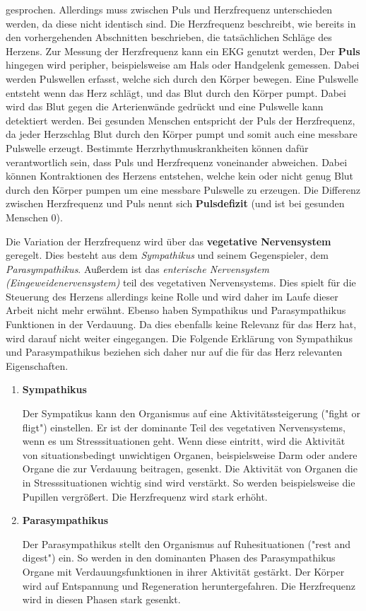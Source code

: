 gesprochen. Allerdings muss zwischen Puls und Herzfrequenz unterschieden werden, da diese nicht identisch sind. 
Die Herzfrequenz beschreibt, wie bereits in den vorhergehenden Abschnitten beschrieben, die tatsächlichen Schläge des Herzens. Zur Messung der Herzfrequenz kann ein EKG genutzt werden,
Der \textbf{Puls} hingegen wird peripher, beispielsweise am Hals oder Handgelenk gemessen. Dabei werden Pulswellen erfasst, welche sich durch den Körper bewegen. Eine Pulswelle entsteht wenn das Herz schlägt, und das Blut durch den Körper pumpt. Dabei wird das Blut gegen die Arterienwände gedrückt und eine Pulswelle kann detektiert werden.
Bei gesunden Menschen entspricht der Puls der Herzfrequenz, da jeder Herzschlag Blut durch den Körper pumpt und somit auch eine messbare Pulswelle erzeugt. Bestimmte Herzrhythmuskrankheiten können dafür verantwortlich sein, dass Puls und Herzfrequenz voneinander abweichen. Dabei können Kontraktionen des Herzens entstehen, welche kein oder nicht genug Blut durch den Körper pumpen um eine messbare Pulswelle zu erzeugen. Die Differenz zwischen Herzfrequenz und Puls nennt sich \textbf{Pulsdefizit} (und ist bei gesunden Menschen 0).

Die Variation der Herzfrequenz wird über das \textbf{vegetative Nervensystem} geregelt. Dies besteht aus dem \textit{Sympathikus} und seinem Gegenspieler, dem \textit{Parasympathikus}. Außerdem ist das \textit{enterische Nervensystem (Eingeweidenervensystem)} teil des vegetativen Nervensystems. Dies spielt für die Steuerung des Herzens allerdings keine Rolle und wird daher im Laufe dieser Arbeit nicht mehr erwähnt. Ebenso haben Sympathikus und Parasympathikus Funktionen in der Verdauung. Da dies ebenfalls keine Relevanz für das Herz hat, wird darauf nicht weiter eingegangen. Die Folgende Erklärung von Sympathikus und Parasympathikus beziehen sich daher nur auf die für das Herz relevanten Eigenschaften.

\begin{enumerate}
	\item \textbf{Sympathikus} 
	
	Der Sympatikus kann den Organismus auf eine Aktivitätssteigerung ("fight or fligt") einstellen. Er ist der dominante Teil des vegetativen Nervensystems, wenn es um Stresssituationen geht. Wenn diese eintritt, wird die Aktivität von situationsbedingt unwichtigen Organen, beispielsweise Darm oder andere Organe die zur Verdauung beitragen, gesenkt. 
	Die Aktivität von Organen die in Stresssituationen wichtig sind wird verstärkt. So werden beispielsweise die Pupillen vergrößert.
	\color{red}Die Herzfrequenz wird stark erhöht.\color{black}
	
	\item \textbf{Parasympathikus}
	
	Der Parasympathikus stellt den Organismus auf Ruhesituationen ("rest and digest") ein. So werden in den dominanten Phasen des Parasympathikus Organe mit Verdauungsfunktionen in ihrer Aktivität gestärkt. Der Körper wird auf Entspannung und Regeneration heruntergefahren. 
	\color{red}Die Herzfrequenz wird in diesen Phasen stark gesenkt.\color{black}
\end{enumerate}

